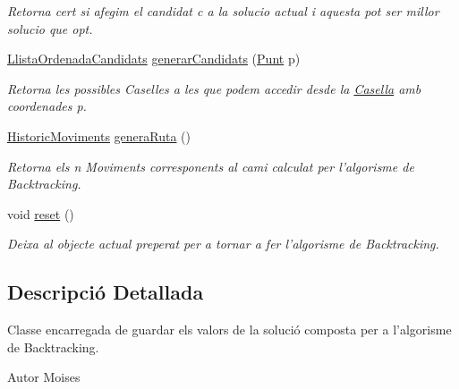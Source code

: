\begin{DoxyCompactItemize}
\begin{DoxyCompactList}\small\item\em Retorna cert si afegim el candidat c a la solucio actual i aquesta pot ser millor solucio que opt. \end{DoxyCompactList}\item 
\hyperlink{classlogica_1_1algoritmica_1_1_llista_ordenada_candidats}{Llista\+Ordenada\+Candidats} \hyperlink{classlogica_1_1algoritmica_1_1_back_tracking_1_1_solucio_a75cbbd1737092ae156d31d27f6a9744f}{generar\+Candidats} (\hyperlink{classlogica_1_1_punt}{Punt} p)
\begin{DoxyCompactList}\small\item\em Retorna les possibles Caselles a les que podem accedir desde la \hyperlink{classlogica_1_1algoritmica_1_1_casella}{Casella} amb coordenades p. \end{DoxyCompactList}\item 
\hyperlink{classlogica_1_1historic__moviments_1_1_historic_moviments}{Historic\+Moviments} \hyperlink{classlogica_1_1algoritmica_1_1_back_tracking_1_1_solucio_ad92451e3b29a2d5918053827e2996ba8}{genera\+Ruta} ()
\begin{DoxyCompactList}\small\item\em Retorna els n Moviments corresponents al cami calculat per l'algorisme de Backtracking. \end{DoxyCompactList}\item 
void \hyperlink{classlogica_1_1algoritmica_1_1_back_tracking_1_1_solucio_ac695cbcd0dc5a3d5e9da492244718681}{reset} ()
\begin{DoxyCompactList}\small\item\em Deixa al objecte actual preperat per a tornar a fer l'algorisme de Backtracking. \end{DoxyCompactList}\end{DoxyCompactItemize}


\subsection{Descripció Detallada}
Classe encarregada de guardar els valors de la solució composta per a l'algorisme de Backtracking. 

\begin{DoxyAuthor}{Autor}
Moises 
\end{DoxyAuthor}


